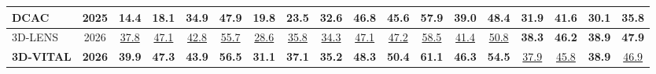 \documentclass[border=4pt]{standalone}
\begin{document}
\begin{tabular}{l c cccccccc cccc cccc}
DCAC & 2025 & 14.4 & 18.1 & 34.9 & 47.9 & 19.8 & 23.5 & 32.6 & 46.8 & 45.6 & 57.9 & 39.0 & 48.4 & 31.9 & 41.6 & 30.1 & 35.8 \\
\midrule
3D-LENS & 2026 & \underline{37.8} & \underline{47.1} & \underline{42.8} & \underline{55.7} & \underline{28.6} & \underline{35.8} & \underline{34.3} & \underline{47.1} & \underline{47.2} & \underline{58.5} & \underline{41.4} & \underline{50.8} & \textbf{38.3} & \textbf{46.2} & \textbf{38.9} & \textbf{47.9} \\
\textbf{3D-VITAL} & \textbf{2026} & \textbf{39.9} & \textbf{47.3} & \textbf{43.9} & \textbf{56.5} & \textbf{31.1} & \textbf{37.1} & \textbf{35.2} & \textbf{48.3} & \textbf{50.4} & \textbf{61.1} & \textbf{46.3} & \textbf{54.5} & \underline{37.9} & \underline{45.8} & \textbf{38.9} & \underline{46.9} \\
\bottomrule
\end{tabular}
\end{document}
